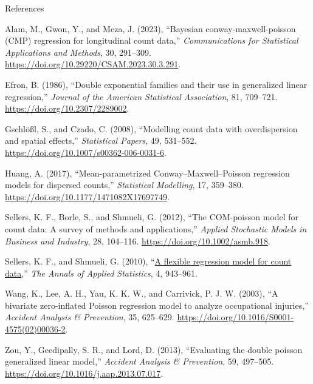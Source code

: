 \documentclass[
  ignorenonframetext,
]{beamer}
\newlength{\cslhangindent}
\newenvironment{CSLReferences}[2] %
 {\begin{list}{}{%
  \setlength{\itemindent}{0pt}
  \setlength{\leftmargin}{0pt}
  \setlength{\parsep}{0pt}
  \ifodd #1
   \setlength{\leftmargin}{\cslhangindent}
   \setlength{\itemindent}{-1\cslhangindent}
  \fi
  \setlength{\itemsep}{#2\baselineskip}}}
 {\end{list}}
\begin{document}
\begin{frame}{References}
\protect\hypertarget{references}{}
\hypertarget{refs}{}
\begin{CSLReferences}{1}{0}
\leavevmode{}%
Alam, M., Gwon, Y., and Meza, J. (2023), {``Bayesian
conway-maxwell-poisson ({CMP}) regression for longitudinal count
data,''} \emph{Communications for Statistical Applications and Methods},
30, 291--309. \url{https://doi.org/10.29220/CSAM.2023.30.3.291}.

\leavevmode{}%
Efron, B. (1986), {``Double exponential families and their use in
generalized linear regression,''} \emph{Journal of the American
Statistical Association}, 81, 709--721.
\url{https://doi.org/10.2307/2289002}.

\leavevmode{}%
Gschlößl, S., and Czado, C. (2008), {``Modelling count data with
overdispersion and spatial effects,''} \emph{Statistical Papers}, 49,
531--552. \url{https://doi.org/10.1007/s00362-006-0031-6}.

\leavevmode{}%
Huang, A. (2017), {``Mean-parametrized {Conway}--{Maxwell}--{Poisson}
regression models for dispersed counts,''} \emph{Statistical Modelling},
17, 359--380. \url{https://doi.org/10.1177/1471082X17697749}.

\leavevmode{}%
Sellers, K. F., Borle, S., and Shmueli, G. (2012), {``The {COM}-poisson
model for count data: A survey of methods and applications,''}
\emph{Applied Stochastic Models in Business and Industry}, 28, 104--116.
\url{https://doi.org/10.1002/asmb.918}.

\leavevmode{}%
Sellers, K. F., and Shmueli, G. (2010),
{``\href{https://www.jstor.org/stable/29765537}{A flexible regression
model for count data},''} \emph{The Annals of Applied Statistics}, 4,
943--961.

\leavevmode{}%
Wang, K., Lee, A. H., Yau, K. K. W., and Carrivick, P. J. W. (2003),
{``A bivariate zero-inflated {Poisson} regression model to analyze
occupational injuries,''} \emph{Accident Analysis \& Prevention}, 35,
625--629. \url{https://doi.org/10.1016/S0001-4575(02)00036-2}.

\leavevmode{}%
Zou, Y., Geedipally, S. R., and Lord, D. (2013), {``Evaluating the
double poisson generalized linear model,''} \emph{Accident Analysis \&
Prevention}, 59, 497--505.
\url{https://doi.org/10.1016/j.aap.2013.07.017}.

\end{CSLReferences}
\end{frame}
\end{document}
